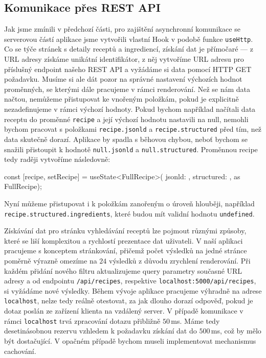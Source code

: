 \subsection{Komunikace přes REST API}

Jak jsme zmínili v předchozí části, pro zajištění asynchronní komunikace se serverovou částí aplikace jsme vytvořili vlastní Hook v podobě funkce \texttt{useHttp}. Co se týče stránek s detaily receptů a ingrediencí, získání dat je přímočaré --- z URL adresy získáme unikátní identifikátor, z něj vytvoříme URL adresu pro příslušný endpoint našeho REST API a vyžádáme si data pomocí HTTP GET požadavku. Musíme si ale dát pozor na správné nastavení výchozích hodnot proměnných, se kterými dále pracujeme v rámci renderování. Než se nám data načtou, nemůžeme přistupovat ke vnořeným položkám, pokud je explicitně nezadefinujeme v rámci výchozí hodnoty. Pokud bychom například načítali data receptu do proměnné \texttt{recipe} a její výchozí hodnotu nastavili na null, nemohli bychom pracovat s položkami \texttt{recipe.jsonld} a \texttt{recipe.structured} před tím, než data skutečně dorazí. Aplikace by spadla s běhovou chybou, neboť bychom se snažili přistoupit k hodnotě \texttt{null.jsonld} a \texttt{null.structured}. Proměnnou recipe tedy raději vytvoříme následovně:
\begingroup
\samepage
\begin{code}
const [recipe, setRecipe] = useState<FullRecipe>({
  jsonld: {},
  structured: {},
} as FullRecipe);
\end{code}
Nyní můžeme přistupovat i k položkám zanořeným o úroveň hlouběji, například \texttt{recipe.structured.ingredients}, které budou mít validní hodnotu \texttt{undefined}.
\endgroup

Získávání dat pro stránku vyhledávání receptů lze pojmout různými způsoby, které se liší komplexitou a rychlostí prezentace dat uživateli. V naší aplikaci pracujeme s konceptem stránkování, přičemž počet výsledků na jedné stránce poměrně výrazně omezíme na $24$ výsledků z důvodu zrychlení renderování. Při každém přidání nového filtru aktualizujeme query parametry současné URL adresy a od endpointu \texttt{/api/recipes}, respektive \texttt{localhost:5000/api/recipes}, si vyžádáme nové výsledky. Během vývoje aplikace pracujeme výhradně na adrese \texttt{localhost}, nelze tedy reálně otestovat, za jak dlouho dorazí odpověď, pokud je dotaz poslán ze zařízení klienta na vzdálený server. V případě komunikace v rámci \texttt{localhost} trvá zpracování dotazu přibližně $50\,$ms. Máme tedy desetinásobnou rezervu vzhledem k požadavku získání dat do $500\,$ms, což by mělo být dostačující. V opačném případě bychom museli implementovat mechanismus cachování.

